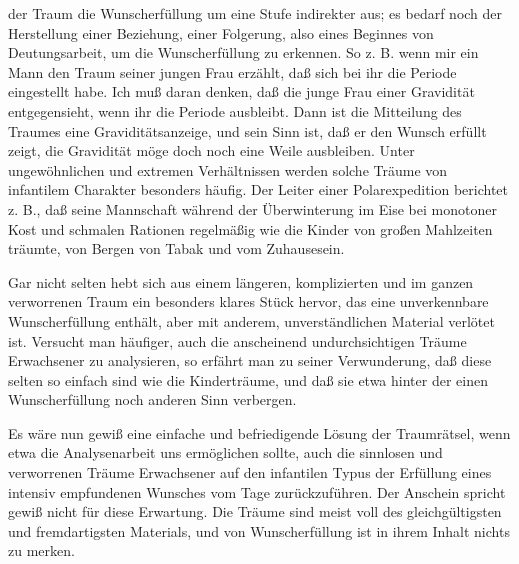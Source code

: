 \documentclass[twoside=true,titlepage=false,open=any, parskip=never, fontsize=10pt, headings=small, chapterprefix=false, appendixprefix=false]{scrbook}
\begin{document}
         
            
            
            
        \pstart
        der Traum die Wunscherfüllung um eine Stufe indirekter aus; es
               bedarf noch der Herstellung einer Beziehung, einer Folgerung, also eines
               Beginnes von Deutungsarbeit, um die Wunscherfüllung zu erkennen. So z. B. wenn
               mir ein Mann den Traum seiner jungen Frau erzählt, daß sich bei ihr die Periode
               eingestellt habe. Ich muß daran denken, daß die junge Frau einer Gravidität
                  entgegensieht, wenn ihr die Periode ausbleibt. Dann ist die Mitteilung des Traumes eine Graviditätsanzeige, und sein Sinn ist,
               daß er den Wunsch erfüllt zeigt, die Gravidität möge doch noch eine Weile
               ausbleiben. Unter ungewöhnlichen und extremen Verhältnissen werden
               solche Träume von infantilem Charakter besonders häufig. Der Leiter einer
               Polarexpedition berichtet z. B., daß seine Mannschaft während der Überwinterung
               im Eise bei monotoner Kost und schmalen Rationen regelmäßig wie die Kinder
               von großen Mahlzeiten träumte, von Bergen von Tabak und vom Zuhausesein.
        \pend
    
            
        \pstart
        Gar nicht selten hebt sich aus einem längeren, komplizierten und im ganzen
               verworrenen Traum ein besonders klares Stück hervor, das eine unverkennbare
               Wunscherfüllung enthält, aber mit anderem, unverständlichen Material verlötet
               ist. Versucht man häufiger, auch die anscheinend undurchsichtigen Träume
               Erwachsener zu analysieren, so erfährt man zu seiner Verwunderung,
               daß diese selten so einfach sind wie die Kinderträume, und daß sie etwa hinter
               der einen Wunscherfüllung noch anderen Sinn verbergen.
        \pend
    
            
        \pstart
        Es wäre nun gewiß eine einfache und befriedigende Lösung der Traumrätsel, wenn
               etwa die Analysenarbeit uns ermöglichen sollte, auch die sinnlosen und
               verworrenen Träume Erwachsener auf den infantilen Typus der Erfüllung eines
               intensiv empfundenen Wunsches vom Tage zurückzuführen. Der Anschein
               spricht gewiß nicht für diese Erwartung. Die Träume sind meist voll des
               gleichgültigsten und fremdartigsten Materials, und von Wunscherfüllung ist in
               ihrem Inhalt nichts zu merken.
        \pend
    
\end{document}
